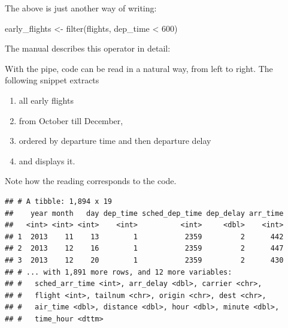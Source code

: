 \documentclass[]{book}
\newenvironment{Shaded}{}{}
\newcommand{\DecValTok}[1]{#1}
\newcommand{\KeywordTok}[1]{\textcolor[rgb]{0.00,0.00,1.00}{#1}}
\newcommand{\NormalTok}[1]{#1}
\newcommand{\OperatorTok}[1]{#1}
\newcommand{\StringTok}[1]{\textcolor[rgb]{0.00,0.50,0.50}{#1}}
\providecommand{\tightlist}{%
  \setlength{\itemsep}{0pt}\setlength{\parskip}{0pt}}
\begin{document}
The above is just another way of writing:

\begin{Shaded}
\begin{Highlighting}[]
\NormalTok{early_flights <-}\StringTok{ }\KeywordTok{filter}\NormalTok{(flights, dep_time }\OperatorTok{<}\StringTok{ }\DecValTok{600}\NormalTok{)}
\end{Highlighting}
\end{Shaded}

The manual describes this operator in detail:

\begin{Shaded}
\end{Shaded}

With the pipe, code can be read in a natural way, from left to right.
The following snippet extracts

\begin{enumerate}
\def\labelenumi{\arabic{enumi}.}
\tightlist
\item
  all early flights
\item
  from October till December,
\item
  ordered by departure time and then departure delay
\item
  and displays it.
\end{enumerate}

Note how the reading corresponds to the code.

\begin{Shaded}
\end{Shaded}

\begin{verbatim}
## # A tibble: 1,894 x 19
##    year month   day dep_time sched_dep_time dep_delay arr_time
##   <int> <int> <int>    <int>          <int>     <dbl>    <int>
## 1  2013    11    13        1           2359         2      442
## 2  2013    12    16        1           2359         2      447
## 3  2013    12    20        1           2359         2      430
## # ... with 1,891 more rows, and 12 more variables:
## #   sched_arr_time <int>, arr_delay <dbl>, carrier <chr>,
## #   flight <int>, tailnum <chr>, origin <chr>, dest <chr>,
## #   air_time <dbl>, distance <dbl>, hour <dbl>, minute <dbl>,
## #   time_hour <dttm>
\end{verbatim}
\end{document}
